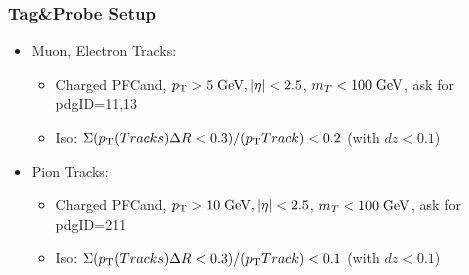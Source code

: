 \documentclass{beamer}
\begin{document}
\begin{frame}
 \frametitle{Tag\&Probe Setup}
\begin{itemize}
 \item Muon, Electron Tracks:
 \begin{itemize}
  \item Charged PFCand, $p_{\text{T}}>5 \;\text{Ge}\kern-0.06667em\text{V}, |\eta|<2.5$, $m_{T}<100 \;\text{Ge}\kern-0.06667em\text{V}$, ask for pdgID=11,13
  \item Iso: $\Sigma ( p_{\text{T}}\text(Tracks)\Delta R<0.3 )/(p_{\text{T}} Track) < 0.2$ (with $dz<0.1$)
 \end{itemize}
 \item Pion Tracks:
 \begin{itemize}
  \item Charged PFCand, $p_{\text{T}}>10 \;\text{Ge}\kern-0.06667em\text{V}, |\eta|<2.5$, $m_{T}<100 \;\text{Ge}\kern-0.06667em\text{V}$, ask for pdgID=211
  \item Iso: $\Sigma ( p_{\text{T}}\text(Tracks)\Delta R<0.3 )/(p_{\text{T}} Track) < 0.1$ (with $dz<0.1$)
 \end{itemize}
 \end{itemize}

 
\end{frame}
\end{document}
